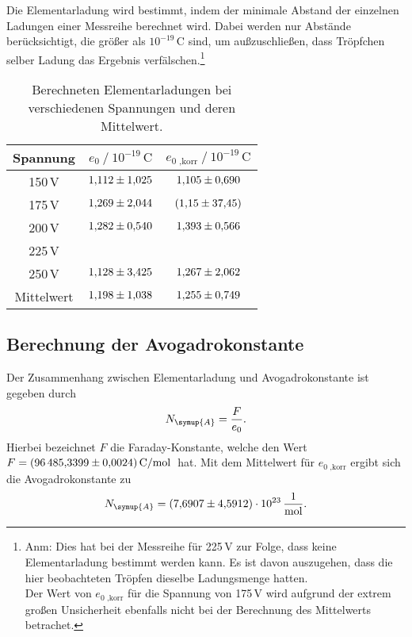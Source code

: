 Die Elementarladung wird bestimmt, indem der minimale Abstand der einzelnen Ladungen einer Messreihe berechnet wird. Dabei 
werden nur Abstände berücksichtigt, die größer als $10^{-19}\,\unit{\coulomb}$ sind, um außzuschließen, dass Tröpfchen selber
Ladung das Ergebnis verfälschen.\footnote{Anm: Dies hat bei der Messreihe für 225\,V zur Folge, dass keine Elementarladung
bestimmt werden kann. Es ist davon auszugehen, dass die hier beobachteten Tröpfen dieselbe Ladungsmenge hatten. \\Der Wert von 
$e_{0\text{ ,korr}}$ für die Spannung von 175\,V wird aufgrund der extrem großen Unsicherheit ebenfalls nicht bei der Berechnung 
des Mittelwerts betrachet.}
\begin{table}[H]
    \centering
    \caption{Berechneten Elementarladungen bei verschiedenen Spannungen und deren Mittelwert.}
    \label{tab:e_0}
    \begin{tabular}{S S S}
        \toprule
        {Spannung} & {$e_0 \mathbin{/} 10^{-19}\,\unit{\coulomb}$} %
        & {$e_{0\text{ ,korr}} \mathbin{/} 10^{-19}\,\unit{\coulomb}$}\\
        \midrule
        {150\,V} & $\num{1.112+-1.025}$ & $\num{1.105+-0.690}$ \\
        {175\,V} & $\num{1.269+-2.044}$ & {$(\num{1.15+-37.45})$} \\
        {200\,V} & $\num{1.282+-0.540}$ & $\num{1.393+-0.566}$ \\
        {225\,V} & {}                   & {}                   \\
        {250\,V} & $\num{1.128+-3.425}$ & $\num{1.267+-2.062}$ \\
        \midrule
        {Mittelwert} & $\num{1.198+-1.038}$ & $\num{1.255+-0.749}$ \\
        \bottomrule
    \end{tabular}
  \end{table}
  
  \subsection{Berechnung der Avogadrokonstante}
  Der Zusammenhang zwischen Elementarladung und Avogadrokonstante ist gegeben durch
  \begin{equation*}
      N_{\symup{A}} = \frac{F}{e_0}.
  \end{equation*}
Hierbei bezeichnet $F$ die Faraday-Konstante, welche den Wert $F=\qty{96 485,3399 +- 0,0024}{\coulomb\per\mol}$\,\cite{czichos} hat.
Mit dem Mittelwert für $e_{0\text{ ,korr}}$ ergibt sich die Avogadrokonstante zu
\begin{equation*}
    N_{\symup{A}} = \qty{7.6907(4.5912)e23}{\per\mol}.
\end{equation*}




